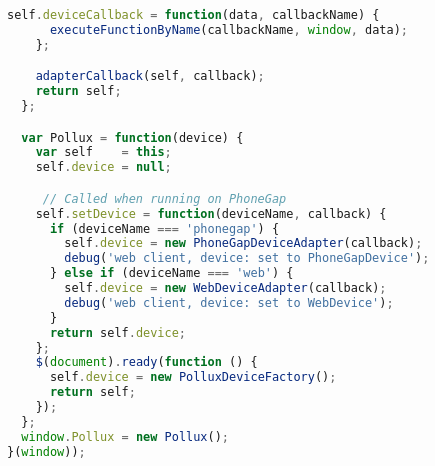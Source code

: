 \begin{appendices}
\begin{lstlisting}[language=JavaScript]
    self.deviceCallback = function(data, callbackName) {
      executeFunctionByName(callbackName, window, data);
    };

    adapterCallback(self, callback);
    return self;
  };

  var Pollux = function(device) {
    var self    = this;
    self.device = null;

     // Called when running on PhoneGap
    self.setDevice = function(deviceName, callback) {
      if (deviceName === 'phonegap') {
        self.device = new PhoneGapDeviceAdapter(callback);
        debug('web client, device: set to PhoneGapDevice');
      } else if (deviceName === 'web') {
        self.device = new WebDeviceAdapter(callback);
        debug('web client, device: set to WebDevice');
      }
      return self.device;
    };
    $(document).ready(function () {  
      self.device = new PolluxDeviceFactory();
      return self;
    });
  };
  window.Pollux = new Pollux();
}(window));
\end{lstlisting}
\end{appendices}